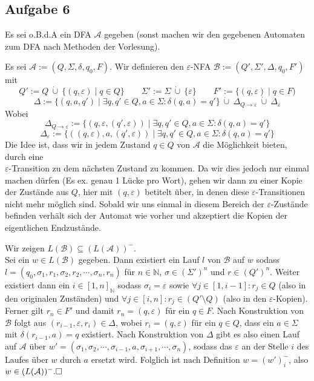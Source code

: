\documentclass[a4paper,graphics,11pt]{article}
\newcommand{\aufgabe}[1]{\subsection*{Aufgabe #1}}
\begin{document}
\newpage
\aufgabe{6}
Es sei o.B.d.A ein DFA $\mathcal{A}$ gegeben (sonst machen wir den gegebenen Automaten zum DFA nach Methoden
der Vorlesung).

Es sei $\mathcal{A} := (Q, \Sigma, \delta, q_0, F)$.
Wir definieren den $\varepsilon$-NFA $\mathcal{B} := (Q', \Sigma', \Delta, q_0, F')$ mit
$$
    Q' := Q\ \dot\cup\ \{(q, \varepsilon) \mid q \in Q\}
    \qquad \Sigma' := \Sigma\ \dot\cup\ \{\varepsilon\}
    \qquad F' := \{(q, \varepsilon) \mid q \in F)
$$$$
    \Delta := \{(q, a, q') \mid \exists q,q' \in Q, a \in \Sigma : \delta(q, a) = q'\}\ \dot\cup\ \Delta_{Q \to \varepsilon}\ \dot\cup\ \Delta_\varepsilon
$$
Wobei
$$
    \Delta_{Q \to \varepsilon} := \{(q, \varepsilon, (q', \varepsilon)) \mid \exists q,q' \in Q, a \in \Sigma : \delta(q, a) = q'\}
$$$$
    \Delta_\varepsilon := \{((q, \varepsilon), a, (q', \varepsilon)) \mid \exists q,q' \in Q, a \in \Sigma : \delta(q, a) = q'\}
$$
Die Idee ist, dass wir in jedem Zustand $q \in Q$ von $\mathcal{A}$ die Möglichkeit bieten, durch eine\\
$\varepsilon$-Transition zu dem nächsten Zustand zu kommen. Da wir dies jedoch nur einmal machen dürfen
(Es ex. genau 1 Lücke pro Wort), gehen wir dann zu einer Kopie der Zustände aus $Q$, hier mit $(q, \varepsilon)$
betitelt über, in denen diese $\varepsilon$-Transitionen nicht mehr möglich sind. Sobald wir uns einmal in diesem
Bereich der $\varepsilon$-Zustände befinden verhält sich der Automat wie vorher und akzeptiert die Kopien der
eigentlichen Endzustände.

Wir zeigen $L(\mathcal{B}) \subseteq (L(\mathcal{A}))^-$.\\[2pt]
Sei ein $w \in L(\mathcal{B})$ gegeben. Dann existiert ein Lauf $l$ von $\mathcal{B}$ auf
$w$ sodass $l = (q_0, \sigma_1, r_1, \sigma_2, r_2, \cdots, \sigma_n, r_n)$ für $n \in \mathbb{N}$, $\sigma \in (\Sigma')^n$ und $r \in (Q')^n$.
Weiter existiert dann ein $i \in [1, n]_\mathbb{N}$ sodass $\sigma_i = \varepsilon$ sowie
$\forall j \in [1, i-1] : r_j \in Q$ (also in den originalen Zuständen) und
$\forall j \in [i, n] : r_j \in (Q'\setminus Q)$ (also in den $\varepsilon$-Kopien).
Ferner gilt $r_n \in F'$ und damit $r_n = (q, \varepsilon)$ für ein $q \in F$.
Nach Konstruktion von $\mathcal{B}$ folgt aus $(r_{i-1}, \varepsilon, r_i) \in \Delta$,
wobei $r_i = (q, \varepsilon)$ für ein $q \in Q$, dass ein $a \in \Sigma$ mit
$\delta(r_{i-1}, a) = q$ existiert. Nach Konstruktion von $\Delta$ gibt es also einen Lauf auf $\mathcal{A}$ über
$w' = (\sigma_1, \sigma_2, \cdots, \sigma_{i-1}, a, \sigma_{i+1}, \cdots, \sigma_n)$, sodass
das $\varepsilon$ an der Stelle $i$ des Laufes über $w$ durch $a$ ersetzt wird. Folglich ist nach Definition
$w = (w')_i^-$, also $w \in (L(\mathcal{A}))^-. \hfill\square$
\end{document}
